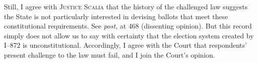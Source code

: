   Still, I agree with \textsc{Justice Scalia} that the history of the
challenged law suggests the State is not particularly interested in
devising ballots that meet these constitutional requirements. See
\emph{post,} at 468 (dissenting opinion). But this record simply does
not allow us to say with certainty that the election system created by
I--872 is unconstitutional. Accordingly, I agree with the Court that
respondents' present challenge to the law must fail, and I join the
Court's opinion.

